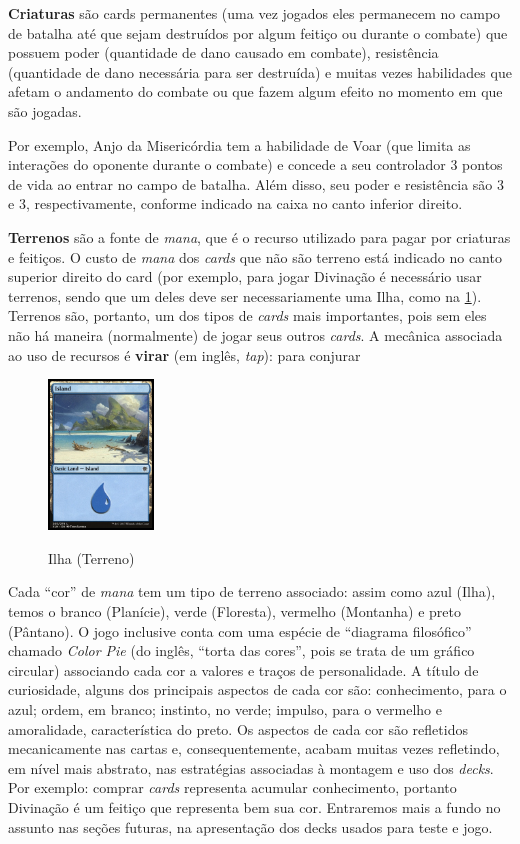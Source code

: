\documentclass{book}
\begin{document}
\textbf{Criaturas} são cards permanentes (uma vez jogados eles
permanecem no campo de batalha até que sejam destruídos por algum
feitiço ou durante o combate) que possuem poder (quantidade de dano
causado em combate), resistência (quantidade de dano necessária para ser
destruída) e muitas vezes habilidades que afetam o andamento do combate
ou que fazem algum efeito no momento em que são jogadas.

Por exemplo, Anjo da Misericórdia tem a habilidade de Voar (que limita
as interações do oponente durante o combate) e concede a seu controlador
3 pontos de vida ao entrar no campo de batalha. Além disso, seu poder e
resistência são 3 e 3, respectivamente, conforme indicado na caixa no
canto inferior direito.

\textbf{Terrenos} são a fonte de \textit{mana}, que é o recurso
utilizado para pagar por criaturas e feitiços. O custo de \textit{mana}
dos \textit{cards} que não são terreno está indicado no canto superior
direito do card (por exemplo, para jogar Divinação é necessário usar
terrenos, sendo que um deles deve ser necessariamente uma Ilha, como na
\ref{ilha}). Terrenos são, portanto, um dos tipos de \textit{cards}
mais importantes, pois sem eles não há maneira (normalmente) de jogar
seus outros \textit{cards}. A mecânica associada ao uso de recursos é
\textbf{virar} (em inglês, \textit{tap}): para conjurar

\begin{figure}
    \centering
    \includegraphics[width=0.25\textwidth]{picstcc/island.jpg}
    \label{ilha}
    \caption{Ilha (Terreno)}
\end{figure}

Cada ``cor'' de \textit{mana} tem um tipo de terreno associado: assim
como azul (Ilha), temos o branco (Planície), verde (Floresta),
vermelho (Montanha) e preto (Pântano). O jogo inclusive conta com uma
espécie de ``diagrama filosófico'' chamado \textit{Color Pie}
(do inglês, ``torta das cores'', pois se trata de um gráfico circular)
associando cada cor a valores e traços de personalidade.
A título de curiosidade, alguns dos principais aspectos de cada cor são:
conhecimento, para o azul; ordem, em branco; instinto, no verde;
impulso, para o vermelho e amoralidade, característica do preto. Os
aspectos de cada cor são refletidos mecanicamente nas cartas e,
consequentemente, acabam muitas vezes refletindo, em nível mais
abstrato, nas estratégias associadas à montagem e uso dos
\textit{decks}.
Por exemplo: comprar \textit{cards} representa acumular conhecimento,
portanto Divinação é um feitiço que representa bem sua cor.
Entraremos mais a fundo no assunto nas seções futuras, na
apresentação dos decks usados para teste e jogo.
\end{document}
